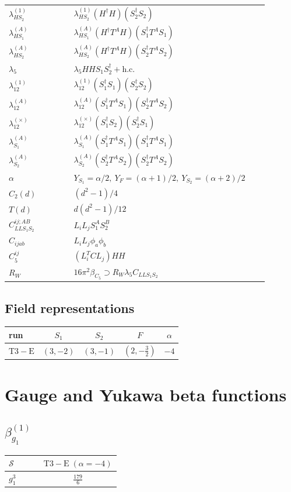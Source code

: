 \documentclass[9pt]{article}
\begin{document}
\begin{longtable}{@{}p{0.23\linewidth}p{0.69\linewidth}@{}}
$\lambda_{HS_2}^{(1)}$ & $\lambda_{HS_2}^{(1)}(H^\dagger H)(S_2^\dagger S_2)$ \\
$\lambda_{HS_1}^{(A)}$ & $\lambda_{HS_1}^{(A)}(H^\dagger T^AH)(S_1^\dagger T^AS_1)$ \\
$\lambda_{HS_2}^{(A)}$ & $\lambda_{HS_2}^{(A)}(H^\dagger T^AH)(S_2^\dagger T^AS_2)$ \\
$\lambda_5$ & $\lambda_5HHS_1S_2^\dagger+\mathrm{h.c.}$ \\
$\lambda_{12}^{(1)}$ & $\lambda_{12}^{(1)}(S_1^\dagger S_1)(S_2^\dagger S_2)$ \\
$\lambda_{12}^{(A)}$ & $\lambda_{12}^{(A)}(S_1^\dagger T^AS_1)(S_2^\dagger T^AS_2)$ \\
$\lambda_{12}^{(\times)}$ & $\lambda_{12}^{(\times)}(S_1^\dagger S_2)(S_2^\dagger S_1)$ \\
$\lambda_{S_1}^{(A)}$ & $\lambda_{S_1}^{(A)}(S_1^\dagger T^A S_1)(S_1^\dagger T^A S_1)$ \\
$\lambda_{S_2}^{(A)}$ & $\lambda_{S_2}^{(A)}(S_2^\dagger T^A S_2)(S_2^\dagger T^A S_2)$ \\
$\alpha$ & $Y_{S_1}=\alpha/2,\ Y_F=(\alpha+1)/2,\ Y_{S_2}=(\alpha+2)/2$ \\
$C_2(d)$ & $(d^2-1)/4$ \\
$T(d)$ & $d(d^2-1)/12$ \\
$C_{LLS_1S_2}^{ij;AB}$ & $L_iL_jS_1^AS_2^B$ \\
$C_{ijab}$ & $L_iL_j\phi_a\phi_b$ \\
$C_5^{ij}$ & $(L_i^TCL_j)HH$ \\
$R_W$ & $16\pi^2\beta_{C_5}\supset R_W\lambda_5C_{LLS_1S_2}$ \\
\bottomrule
\end{longtable}
\subsection*{Field representations}
\begin{longtable}{@{}lcccc@{}}
\toprule
run & $S_1$ & $S_2$ & $F$ & $\alpha$ \\
\midrule
$\mathrm{T3-E}$ & $(3,-2)$ & $(3,-1)$ & $(2,- \frac{3}{2})$ & $-4$ \\
\bottomrule
\end{longtable}
\section*{Gauge and Yukawa beta functions}
\subsection*{$ \beta_{g_1}^{(1)} $}
\begin{longtable}{@{}p{0.38\linewidth}c@{}}
\toprule
$\mathcal{S}$ & $ \mathrm{T3-E}\;(\alpha=-4) $ \\
\midrule
$ g_1^3 $ & $ \frac{179}{6} $ \\
\bottomrule
\end{longtable}
\end{document}
